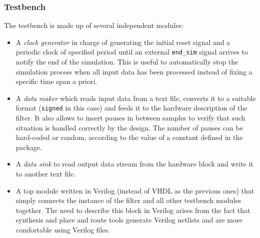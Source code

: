 \documentclass[a4paper]{article}
\begin{document}
\subsubsection{Testbench}
The testbench is made up of several independent modules:
\begin{itemize}
    \item A \emph{clock generator} in charge of generating the initial reset signal and a periodic clock of specified period until an external \texttt{end\_sim} signal arrives to notify the end of the simulation. This is useful to automatically stop the simulation process when all input data has been processed instead of fixing a specific time span a priori.
    \item A \emph{data maker} which reads input data from a text file, converts it to a suitable format (\texttt{signed} in this case) and feeds it to the hardware description of the filter. It also allows to insert pauses in between samples to verify that such situation is handled correctly by the design. The number of pauses can be hard-coded or random, according to the value of a constant defined in the package.
    \item A \emph{data sink} to read output data stream from the hardware block and write it to another text file.
    \item A top module written in Verilog (instead of VHDL as the previous ones) that simply connects the instance of the filter and all other testbench modules together. The need to describe this block in Verilog arises from the fact that synthesis and place and route tools generate Verilog netlists and are more comfortable using Verilog files.
\end{itemize}
\end{document}
